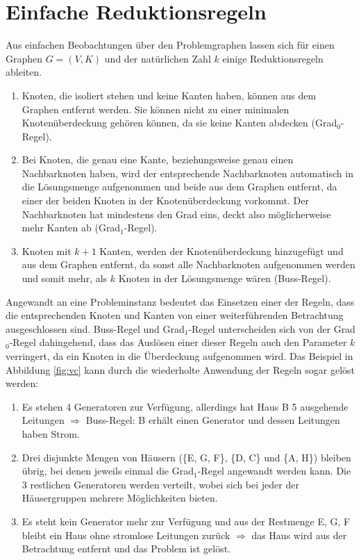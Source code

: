 \label{ch:Grundlagen:sec:Knotenüberdeckung}
\section{Einfache Reduktionsregeln}
\label{ch:Grundlagen:sec:Einfache Reduktionsregeln}
Aus einfachen Beobachtungen über den Problemgraphen lassen sich für einen Graphen $G=(V,K)$ und der natürlichen Zahl $k$ einige Reduktionsregeln ableiten.
\begin{enumerate}
\item Knoten, die isoliert stehen und keine Kanten haben, können aus dem Graphen entfernt werden. Sie können nicht zu einer minimalen Knotenüberdeckung gehören können, da sie keine Kanten abdecken (Grad$_{0}$-Regel).
\item Bei Knoten, die genau eine Kante, beziehungsweise genau einen Nachbarknoten haben, wird der entsprechende Nachbarknoten automatisch in die Lösungsmenge aufgenommen und beide aus dem Graphen entfernt, da einer der beiden Knoten in der Knotenüberdeckung vorkommt. Der Nachbarknoten hat mindestens den Grad eins, deckt also möglicherweise mehr Kanten ab (Grad$_{1}$-Regel).
\item Knoten mit $k+1$ Kanten, werden der Knotenüberdeckung hinzugefügt und aus dem Graphen entfernt, da sonst alle Nachbarknoten aufgenommen werden und somit mehr, als $k$ Knoten in der Lösungsmenge wären (Buss-Regel).
\end{enumerate}
Angewandt an eine Probleminstanz bedeutet das Einsetzen einer der Regeln, dass die entsprechenden Knoten und Kanten von einer weiterführenden Betrachtung ausgeschlossen sind. Buss-Regel und Grad$_{1}$-Regel unterscheiden sich von der Grad$_{0}$-Regel dahingehend, dass das Auslösen einer dieser Regeln auch den Parameter $k$ verringert, da ein Knoten in die Überdeckung aufgenommen wird.
Das Beispiel in Abbildung \ref{fig:vc} kann durch die wiederholte Anwendung der Regeln sogar gelöst werden:
\begin{enumerate}
\item Es stehen 4 Generatoren zur Verfügung, allerdings hat Haus B 5 ausgehende Leitungen $\Rightarrow$ Buss-Regel: B erhält einen Generator und dessen Leitungen haben Strom.
\item Drei disjunkte Mengen von Häusern (\{E, G, F\}, \{D, C\} und \{A, H\}) bleiben übrig, bei denen jeweils einmal die Grad$_{1}$-Regel angewandt werden kann. Die 3 restlichen Generatoren werden verteilt, wobei sich bei jeder der Häusergruppen mehrere Möglichkeiten bieten.
\item Es steht kein Generator mehr zur Verfügung und aus der Restmenge {E, G, F} bleibt ein Haus ohne stromlose Leitungen zurück $\Rightarrow$ das Haus wird aus der Betrachtung entfernt und das Problem ist gelöst.
\end{enumerate}
